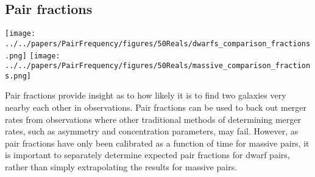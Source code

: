 \documentclass[twocolumn]{aastex63}
\newcommand\msun{\rm{M}_{\odot}}
\newcommand\ID{\textit{Illustris-Dark}}
\newcommand\IH{\textit{Illustris-Hydro}}
\newcommand{\kc}[1]{\textcolor{mypink}{\textbf{#1}} }
\newcommand{\gb}[1]{\textcolor{olive}{\textbf{#1}} }
\begin{document}
\subsection{Pair fractions}\label{sec:pairFracs}

\begin{figure*}
  \centering
  \texttt{[image: ../../papers/PairFrequency/figures/50Reals/dwarfs\_comparison\_fractions.png]}
  \texttt{[image: ../../papers/PairFrequency/figures/50Reals/massive\_comparison\_fractions.png]}
  \caption{\label{fig:pairFrac} The fraction of primary subhalos with companions of different types, relative to all primary subhalos, is plotted as a function of redshift. Results for \ID\ are on the left and for \IH\ on the right. Dwarf Pairs are in the top panels and Massive Pairs are shown in the bottom panels. (Blue) All dwarf (massive) primaries with any companion that passes the lower stellar mass threshold of $10^8 \msun$ ($10^9 \msun$). The fraction of dwarf galaxy pairs of all types decreases steadily from $z\sim2.5$ to today. Massive galaxy pairs demonstrate the opposite behavior, increasing with decreasing redshift. (Purple) Primaries with a companion with a stellar mass ratio between $1$ and $\frac{1}{4}$ (major pairs). Massive major pairs show little evolution with redshift and good agreement between \ID\ and \IH\. In contrast, the fraction of dwarf major pairs increases with redshift, peaking at $z\sim$2. The fraction is lower in \IH\ than in \ID\. (Yellow) Primaries with a companion with a stellar mass ratio between $\frac{1}{4}$ and $\frac{1}{10}$ (minor pairs). In all cases the fraction of minor pairs rises slightly with increasing redshift. (Orange) Primaries with a companion with a stellar mass ratio less than $\frac{1}{4}$ and a stellar mass greater than $10^8 M_\odot$ (minor+ pairs). Dwarf minor+ pair fractions show little evolution with redshift, while massive minor+ pair fractions increase with decreasing redshift.
}
\end{figure*}

Pair fractions provide insight as to how likely it is to find two galaxies very nearby each other in observations. Pair fractions can be used to back out merger rates from observations where other traditional methods of determining merger rates, such as asymmetry and concentration parameters, may fail. However, as pair fractions have only been calibrated as a function of time for massive pairs, it is important to separately determine expected pair fractions for dwarf pairs, rather than simply extrapolating the results for massive pairs.
\end{document}
